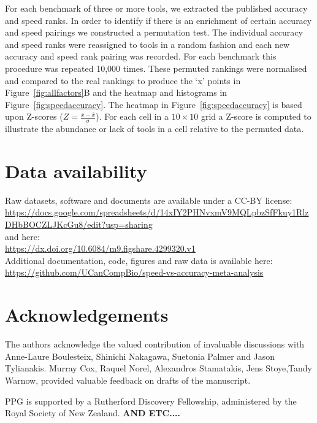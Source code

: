 \documentclass[fleqn,10pt]{SelfArx} %
\begin{document}
For each benchmark of three or more tools, we extracted the published
accuracy and speed ranks. In order to identify if there is an
enrichment of certain accuracy and speed pairings we constructed a
permutation test. The individual accuracy and speed ranks were
reassigned to tools in a random fashion and each new accuracy and
speed rank pairing was recorded. For each benchmark this procedure was
repeated 10,000 times. These permuted rankings were normalised and
compared to the real rankings to produce the ‘x’ points in
Figure~\ref{fig:allfactors}B and the heatmap and histograms in
Figure~\ref{fig:speedaccuracy}. The heatmap in
Figure~\ref{fig:speedaccuracy} is based upon Z-scores
($Z=\frac{x-\bar{x}}{\sigma}$). For each cell in a $10\times 10$ grid
a Z-score is computed to illustrate the abundance or lack of tools in
a cell relative to the permuted data.

\section*{Data availability}
Raw datasets, software and documents are available under a CC-BY license:\\
\fussy
\url{https://docs.google.com/spreadsheets/d/14xIY2PHNvxmV9MQLpbzSfFkuy1RlzDHbBOCZLJKcGu8/edit?usp=sharing}\\
and here:\\
\fussy
\url{https://dx.doi.org/10.6084/m9.figshare.4299320.v1}\\
\sloppy
Additional documentation, code, figures and raw data is available here:\\
\fussy
\url{https://github.com/UCanCompBio/speed-vs-accuracy-meta-analysis}
\sloppy

\section*{Acknowledgements}

The authors acknowledge the valued contribution of invaluable
discussions with Anne-Laure Boulesteix, Shinichi Nakagawa, Suetonia
Palmer and Jason Tylianakis. Murray Cox, Raquel
Norel, Alexandros Stamatakis, Jens Stoye,Tandy Warnow, provided
valuable feedback on drafts of the manuscript.

PPG is supported by a Rutherford Discovery Fellowship,
administered by the Royal Society of New Zealand. 
{\bf AND ETC....}



\end{document}
